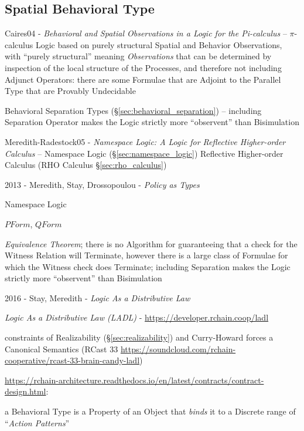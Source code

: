 \subsection{Spatial Behavioral Type}\label{sec:spatial_behavioral}

Caires04 - \emph{Behavioral and Spatial Observations in a Logic for the
  Pi-calculus} -- $\pi$-calculus Logic based on purely structural
Spatial and Behavior Observations, with ``purely structural'' meaning
\emph{Observations} that can be determined by inspection of the local structure
of the Processes, and therefore not including Adjunct Operators: there are some
Formulae that are Adjoint to the Parallel Type that are Provably Undecidable

\fist Behavioral Separation Types (\S\ref{sec:behavioral_separation}) --
including Separation Operator makes the Logic strictly more ``observent'' than
Bisimulation

Meredith-Radestock05 - \emph{Namespace Logic: A Logic for Reflective
  Higher-order Calculus} -- Namespace Logic (\S\ref{sec:namespace_logic})
Reflective Higher-order Calculus (RHO Calculus \S\ref{sec:rho_calculus})

2013 - Meredith, Stay, Drossopoulou - \emph{Policy as Types}

Namespace Logic

$PForm$, $QForm$

\emph{Equivalence Theorem}; there is no Algorithm for guaranteeing that a check
for the Witness Relation will Terminate, however there is a large class of
Formulae for which the Witness check does Terminate; including Separation makes
the Logic strictly more ``observent'' than Bisimulation

2016 - Stay, Meredith - \emph{Logic As a Distributive Law}

\emph{Logic As a Distributive Law (LADL)} -
\url{https://developer.rchain.coop/ladl}

constraints of Realizability (\S\ref{sec:realizability}) and Curry-Howard forces
a Canonical Semantics (RCast 33
\url{https://soundcloud.com/rchain-cooperative/rcast-33-brain-candy-ladl})

\url{https://rchain-architecture.readthedocs.io/en/latest/contracts/contract-design.html}:

a Behavioral Type is a Property of an Object that \emph{binds} it to a Discrete
range of ``\emph{Action Patterns}''

